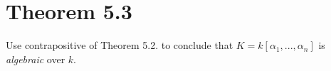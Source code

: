 \section{Theorem 5.3}

Use contrapositive of Theorem 5.2. to conclude that $K=k[\alpha_1,...,\alpha_n]$ is \textit{algebraic} over $k$.